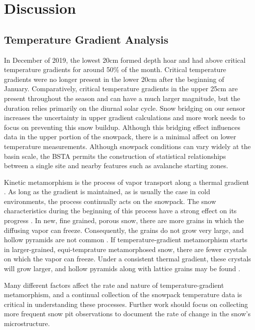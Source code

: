 \chapter{Discussion}

\section{Temperature Gradient Analysis}
In December of 2019, the lowest 20cm formed depth hoar and had above critical temperature gradients for around 50\% of the month. Critical temperature gradients were no longer present in the lower 20cm after the beginning of January. Comparatively, critical temperature gradients in the upper 25cm are present throughout the season and can have a much larger magnitude, but the duration relies primarily on the diurnal solar cycle. Snow bridging on our sensor increases the uncertainty in upper gradient calculations and more work needs to focus on preventing this snow buildup. Although this bridging effect influences data in the upper portion of the snowpack, there is a minimal affect on lower temperature measurements. Although snowpack conditions can vary widely at the basin scale, the BSTA permits the construction of statistical relationships between a single site and nearby features such as avalanche starting zones. 

Kinetic metamorphism is the process of vapor transport along a thermal gradient \citep{sommerfeld_1970}. As long as the gradient is maintained, as is usually the case in cold environments, the process continually acts on the snowpack. The snow characteristics during the beginning of this process have a strong effect on its progress \citep{sommerfeld_1970}. In new, fine grained, porous snow, there are more grains in which the diffusing vapor can freeze. Consequently, the grains do not grow very large, and hollow pyramids are not common \citep{sommerfeld_1970}. If temperature-gradient metamorphism starts in larger-grained, equi-temprature metamorphosed snow, there are fewer crystals on which the vapor can freeze. Under a consistent thermal gradient, these crystals will grow larger, and hollow pyramids along with lattice grains may be found \citep{akitaya_1967}. 

Many different factors affect the rate and nature of temperature-gradient metamorphism, and a continual collection of the snowpack temperature data is critical in understanding these processes. Further work should focus on collecting more frequent snow pit observations to document the rate of change in the snow's microstructure. 

